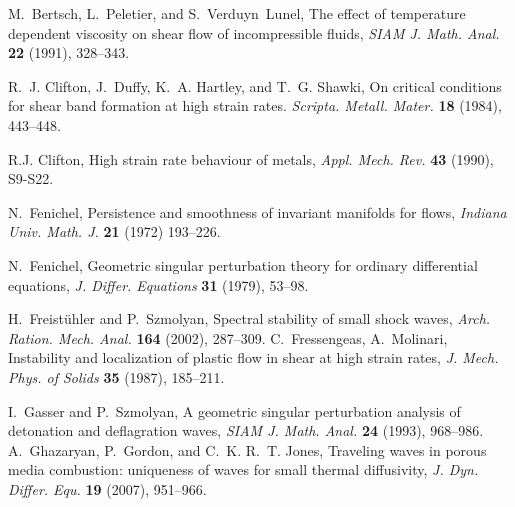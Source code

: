 \documentclass[a4paper,11pt]{article}
\numberwithin{step}{dummy}
\begin{document}

\begin{thebibliography}{10}
{\sc M.~Bertsch, L.~Peletier, and S.~Verduyn~Lunel}, 
The effect of temperature dependent viscosity on shear flow of  incompressible fluids,
{\it SIAM J. Math. Anal.} {\bf 22 } (1991), 328--343.

{\sc R.~J. Clifton, J.~Duffy, K.~A. Hartley, and T.~G. Shawki}, 
On critical conditions for shear band formation at high strain rates.
{\it Scripta. Metall. Mater.}
{\bf 18} (1984), 443--448.

{\sc R.J. Clifton},  High strain rate behaviour of metals, 
{\it Appl. Mech. Rev.}
{\bf 43} (1990), S9-S22.

{\sc N.~Fenichel},
Persistence and smoothness of invariant manifolds for  flows, 
{\it Indiana Univ. Math. J.} {\bf 21} (1972) 193--226.

{\sc N.~Fenichel}, 
Geometric singular perturbation theory for ordinary differential equations, 
{\it J. Differ. Equations} {\bf 31} (1979), 53--98.

{\sc H.~Freistühler and P.~Szmolyan}, 
{Spectral stability of small shock waves}, 
{\it Arch. Ration. Mech. Anal.}
{\bf 164} (2002), 287--309.
{\sc C.~Fressengeas, A.~Molinari},
{Instability and localization of plastic flow in shear at high strain rates},
{\it J. Mech. Phys. of Solids}
{\bf 35} (1987), 185--211.

{\sc I.~Gasser and P.~Szmolyan}, 
{A geometric singular perturbation analysis of detonation and deflagration waves}, 
{\it {SIAM} J. Math. Anal.}
{\bf 24} (1993), 968--986.
{\sc A.~Ghazaryan, P.~Gordon, and C.~K. R.~T. Jones}, 
{Traveling waves in porous media combustion: uniqueness of waves for small thermal diffusivity},
{\it J. Dyn. Differ. Equ.}
{\bf 19} (2007), 951--966.



\end{thebibliography}
\end{document}
